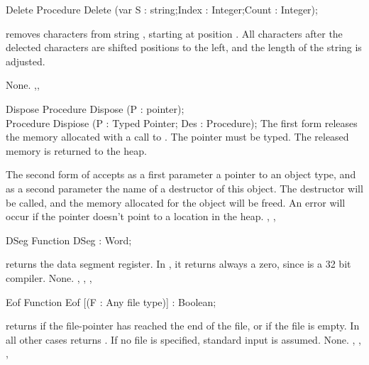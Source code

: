 \documentclass{report}
\begin{document}

\begin{procedure}{Delete}
\Declaration
Procedure Delete (var S : string;Index : Integer;Count : Integer);

\Description
{} removes  characters from string , starting
at position . All characters after the delected characters are 
shifted  positions to the left, and the length of the string is adjusted.

\Errors
None.
\SeeAlso
{},,
\end{procedure}


\begin{procedure}{Dispose}
\Declaration
Procedure Dispose (P : pointer);\\
Procedure Dispiose (P : Typed Pointer; Des : Procedure);
\Description
The first form  releases the memory allocated with a call to 
. The pointer  must be typed. The released memory is 
returned to the heap.

The second form of  accepts as a first parameter a pointer 
to an object type, and as a second parameter the name of a destructor
of this object. The destructor will be called, and the memory allocated 
for the object will be freed.
\Errors
An error will occur if the pointer doesn't point to a location in the
heap.
\SeeAlso
{}, , 
\end{procedure}


\begin{function}{DSeg}
\Declaration
Function DSeg  : Word;

\Description
{} returns the data segment register. In \fpc, it returns always a
zero, since \fpc is a 32 bit compiler.
\Errors
None.
\SeeAlso
{}, , , 
\end{function}


\begin{function}{Eof}
\Declaration
Function Eof [(F : Any file type)] : Boolean;

\Description
{} returns  if the file-pointer has reached the end of the
file, or if the file is empty. In all other cases  returns
.
If no file  is specified, standard input is assumed.
\Errors
None.
\SeeAlso
{}, , , 
\end{function}
\end{document}
